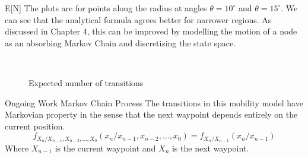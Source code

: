 \documentclass{beamer}
\begin{document}
\begin{frame}{E[N]}
The plots are for points along the radius at angles $\theta = 10^{\circ}$ and $\theta = 15^{\circ}$. We can see that the analytical formula agrees better for narrower regions. As discussed in Chapter 4, this can be improved by modelling the motion of a node as an absorbing Markov Chain and discretizing the state space.

\begin{figure}[ht!]
     \begin{center}
%
        \\ %
%
    \end{center}
	\caption[Expected number of transitions]{Expected number of transitions}%
   \label{fig:EN}
\end{figure}
\end{frame}


\begin{frame}{Ongoing Work} {Markov Chain Process}
The transitions in this mobility model have Markovian property in the sense that the next waypoint depends entirely on the current position. 
\begin{equation*}
	f_{X_n/X_{n-1},X_{n-2},\ldots,X_0}(x_n/x_{n-1},x_{n-2},\ldots,x_{0}) = f_{X_n/X_{n-1}}(x_n/x_{n-1})
\end{equation*}
Where $X_{n-1}$ is the current waypoint and $X_n$ is the next waypoint. \\
\end{frame}
\end{document}
